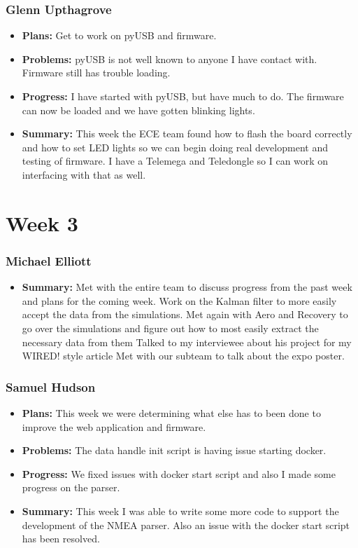 \documentclass[onecolumn, draftclsnofoot,10pt, compsoc]{IEEEtran}
\begin{document}
\subsubsection{Glenn Upthagrove}
\begin {itemize}
 \item \textbf{Plans: }Get to work on pyUSB and firmware. 
 \item \textbf{Problems: }pyUSB is not well known to anyone I have contact with. Firmware still has trouble loading. 
 \item \textbf{Progress: }I have started with pyUSB, but have much to do. The firmware can now be loaded and we have gotten blinking lights.  
 \item \textbf{Summary: }This week the ECE team found how to flash the board correctly and how to set LED lights so we can begin doing real development and testing of firmware. I have a Telemega and Teledongle so I can work on interfacing with that as well.  
\end {itemize}

\section{Week 3}
\subsubsection{Michael Elliott}
\begin {itemize}
 \item \textbf{Summary: }Met with the entire team to discuss progress from the past week and
plans for the coming week.
Work on the Kalman filter to more easily accept the data from the simulations.
Met again with Aero and Recovery to go over the simulations and figure
out how to most easily extract the necessary data from them
Talked to my interviewee about his project for my WIRED! style article
Met with our subteam to talk about the expo poster.
\end{itemize}
\subsubsection{Samuel Hudson}
\begin {itemize}
 \item \textbf{Plans: }This week we were determining what else has to been done to improve the web application and firmware. 
 \item \textbf{Problems: }The data handle init script is having issue starting docker.
 \item \textbf{Progress: }We fixed issues with docker start script and also I made some progress on the parser.
 \item \textbf{Summary: }This week I was able to write some more code to support the development of the NMEA parser. Also an issue with the docker start script has been resolved.
\end {itemize}
\end{document}
